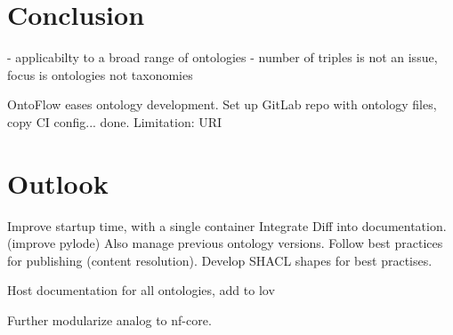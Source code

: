\documentclass[sigconf]{acmart}
\begin{document}
\section{Conclusion}

- applicabilty to a broad range of ontologies 
- number of triples is not an issue, focus is ontologies not taxonomies

OntoFlow eases ontology development.
Set up GitLab repo with ontology files, copy CI config... done.
Limitation: URI


\section{Outlook}

Improve startup time, with a single container
Integrate Diff into documentation. (improve pylode)
Also manage previous ontology versions.
Follow best practices for publishing (content resolution).
Develop SHACL shapes for best practises.

Host documentation for all ontologies, add to lov

Further modularize analog to nf-core.



\end{document}
